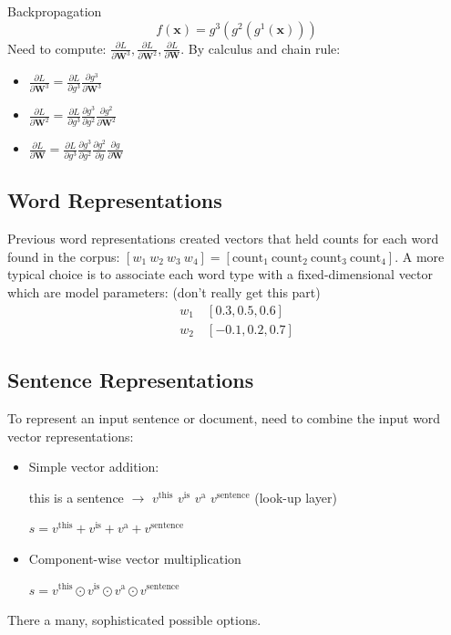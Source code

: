 \documentclass{article}
\begin{document}
Backpropagation
\[f(\mathbf{x}) = g^3(g^2(g^1(\mathbf{x})))\]
Need to compute: $\frac{\partial L}{\partial \mathbf{W}^3}, \frac{\partial L}{\partial \mathbf{W}^2}, \frac{\partial L}{\partial \mathbf{W}}$. By calculus and chain rule:
\begin{itemize}
    \item $\frac{\partial L}{\partial \mathbf{W}^3} = \frac{\partial L}{\partial g^3}\frac{\partial g^3}{\partial \mathbf{W}^3}$
    \item $\frac{\partial L}{\partial \mathbf{W}^2} = \frac{\partial L}{\partial g^3}\frac{\partial g^3}{\partial g^2}\frac{\partial g^2}{\partial \mathbf{W}^2}$
    \item $\frac{\partial L}{\partial \mathbf{W}} = \frac{\partial L}{\partial g^3}\frac{\partial g^3}{\partial g^2}\frac{\partial g^2}{\partial g}\frac{\partial g}{\partial \mathbf{W}}$
\end{itemize}
\subsection{Word Representations}
Previous word representations created vectors that held counts for each word found in the corpus: $[w_1\ w_2\ w_3\ w_4] = [\text{count}_1\ \text{count}_2\ \text{count}_3\ \text{count}_4]$.
\bigbreak \noindent
A more typical choice is to associate each word type with a fixed-dimensional vector which are model parameters: (don't really get this part)
\begin{align*}
    w_1&\ [0.3, 0.5, 0.6]\\
    w_2&\ [-0.1,0.2,0.7]
\end{align*}
\subsection{Sentence Representations}
To represent an input sentence or document, need to combine the input word vector representations:
\begin{itemize}
    \item Simple vector addition:
    
    this is a sentence $\rightarrow$ $v^{\text{this}}$ $v^{\text{is}}$ $v^{\text{a}}$ $v^{\text{sentence}}$ (look-up layer)
    
    $s = v^{\text{this}} + v^{\text{is}} + v^{\text{a}} + v^{\text{sentence}}$
    \item Component-wise vector multiplication
    
    $s = v^{\text{this}} \odot v^{\text{is}} \odot v^{\text{a}} \odot v^{\text{sentence}}$
\end{itemize}
There a many, sophisticated possible options.
\end{document}
